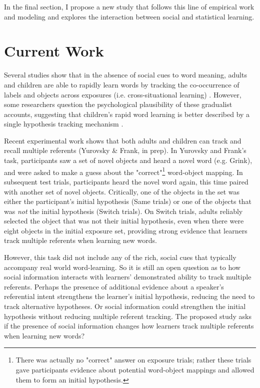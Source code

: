 \documentclass[man]{apa2}
\begin{document}
In the final section, I propose a new study that follows this line of empirical work and modeling\cite{johnson2012exploiting,frank2009using,yu2007unified,hollich2000breaking} and explores the interaction between social and statistical learning.


\section{Current Work}

Several studies show that in the absence of social cues to word meaning, adults and children are able to rapidly learn words by tracking the co-occurrence of labels and objects across exposures (i.e. cross-situational learning) \cite{smith2008infants,vouloumanos2008fine}. However, some researchers question the psychological plausibility of these gradualist accounts, suggesting that children's rapid word learning is better described by a single hypothesis tracking mechanism \cite{trueswell2013propose,medina2011words}. 

Recent experimental work shows that both adults and children can track and recall 
multiple referents (Yurovsky & Frank, in prep). In Yurovsky and Frank's task, participants saw a set of novel objects and heard a novel word (e.g. Grink), and were asked to make a guess about the "correct"\footnote{There was actually no "correct" answer on exposure trials; rather these trials gave participants evidence about potential word-object mappings and allowed them to form an initial hypothesis.} word-object mapping. In subsequent test trials, participants heard the novel word again, this time paired with another set of novel objects. Critically, one of the objects in the set was either the participant's initial hypothesis (Same trials) or one of the objects that was \emph{not} the initial hypothesis (Switch trials). On Switch trials, adults reliably selected the object that was not their initial hypothesis, even when there were eight objects in the initial exposure set, providing strong evidence that learners track multiple referents when learning new words. 

However, this task did not include any of the rich, social cues that typically accompany real world 
word-learning. So it is still an open question as to how social information interacts with learners' 
demonstrated ability to track multiple referents. Perhaps the presence of additional evidence about 
a speaker's referential intent strengthens the learner's initial hypothesis, reducing the need to track 
alternative hypotheses. Or social information could strengthen the initial hypothesis 
without reducing multiple referent tracking. The proposed study asks if the presence of social information changes how learners track multiple referents when learning new words?
\end{document}
